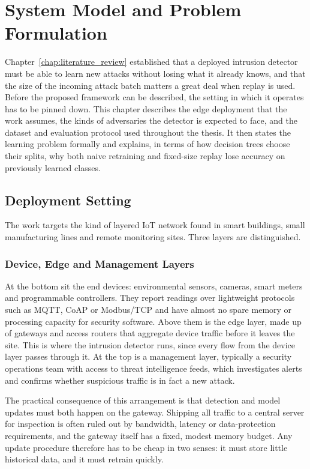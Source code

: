 \chapter{System Model and Problem Formulation}
\label{chap:system_model}

Chapter~\ref{chap:literature_review} established that a deployed intrusion detector must be able to learn new attacks without losing what it already knows, and that the size of the incoming attack batch matters a great deal when replay is used. Before the proposed framework can be described, the setting in which it operates has to be pinned down. This chapter describes the edge deployment that the work assumes, the kinds of adversaries the detector is expected to face, and the dataset and evaluation protocol used throughout the thesis. It then states the learning problem formally and explains, in terms of how decision trees choose their splits, why both naive retraining and fixed-size replay lose accuracy on previously learned classes.

\section{Deployment Setting}
\label{sec:deployment}

The work targets the kind of layered IoT network found in smart buildings, small manufacturing lines and remote monitoring sites. Three layers are distinguished.

\subsection{Device, Edge and Management Layers}
\label{subsec:layers}

At the bottom sit the end devices: environmental sensors, cameras, smart meters and programmable controllers. They report readings over lightweight protocols such as MQTT, CoAP or Modbus/TCP and have almost no spare memory or processing capacity for security software. Above them is the edge layer, made up of gateways and access routers that aggregate device traffic before it leaves the site. This is where the intrusion detector runs, since every flow from the device layer passes through it. At the top is a management layer, typically a security operations team with access to threat intelligence feeds, which investigates alerts and confirms whether suspicious traffic is in fact a new attack.

The practical consequence of this arrangement is that detection and model updates must both happen on the gateway. Shipping all traffic to a central server for inspection is often ruled out by bandwidth, latency or data-protection requirements, and the gateway itself has a fixed, modest memory budget. Any update procedure therefore has to be cheap in two senses: it must store little historical data, and it must retrain quickly.

